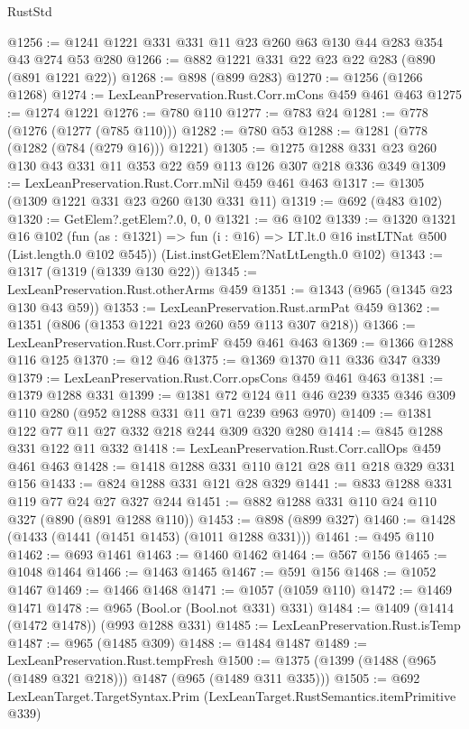 \begin{lexlean}{RustStd}
\begin{coremodule}
@1256 := @1241 @1221 @331 @331 @11 @23 @260 @63 @130 @44 @283 @354 @43 @274 @53 @280
@1266 := @882 @1221 @331 @22 @23 @22 @283 (@890 (@891 @1221 @22))
@1268 := @898 (@899 @283)
@1270 := @1256 (@1266 @1268)
@1274 := LexLeanPreservation.Rust.Corr.mCons @459 @461 @463
@1275 := @1274 @1221
@1276 := @780 @110
@1277 := @783 @24
@1281 := @778 (@1276 (@1277 (@785 @110)))
@1282 := @780 @53
@1288 := @1281 (@778 (@1282 (@784 (@279 @16))) @1221)
@1305 := @1275 @1288 @331 @23 @260 @130 @43 @331 @11 @353 @22 @59 @113 @126 @307 @218 @336 @349
@1309 := LexLeanPreservation.Rust.Corr.mNil @459 @461 @463
@1317 := @1305 (@1309 @1221 @331 @23 @260 @130 @331 @11)
@1319 := @692 (@483 @102)
@1320 := GetElem?.getElem?.{0, 0, 0}
@1321 := @6 @102
@1339 := @1320
    @1321
    @16
    @102
    (fun (as : @1321) => fun (i : @16) => LT.lt.{0} @16 instLTNat @500 (List.length.{0} @102 @545))
    (List.instGetElem?NatLtLength.{0} @102)
@1343 := @1317 (@1319 (@1339 @130 @22))
@1345 := LexLeanPreservation.Rust.otherArms @459
@1351 := @1343 (@965 (@1345 @23 @130 @43 @59))
@1353 := LexLeanPreservation.Rust.armPat @459
@1362 := @1351 (@806 (@1353 @1221 @23 @260 @59 @113 @307 @218))
@1366 := LexLeanPreservation.Rust.Corr.primF @459 @461 @463
@1369 := @1366 @1288 @116 @125
@1370 := @12 @46
@1375 := @1369 @1370 @11 @336 @347 @339
@1379 := LexLeanPreservation.Rust.Corr.opsCons @459 @461 @463
@1381 := @1379 @1288 @331
@1399 := @1381
    @72
    @124
    @11
    @46
    @239
    @335
    @346
    @309
    @110
    @280
    (@952 @1288 @331 @11 @71 @239 @963 @970)
@1409 := @1381 @122 @77 @11 @27 @332 @218 @244 @309 @320 @280
@1414 := @845 @1288 @331 @122 @11 @332
@1418 := LexLeanPreservation.Rust.Corr.callOps @459 @461 @463
@1428 := @1418 @1288 @331 @110 @121 @28 @11 @218 @329 @331 @156
@1433 := @824 @1288 @331 @121 @28 @329
@1441 := @833 @1288 @331 @119 @77 @24 @27 @327 @244
@1451 := @882 @1288 @331 @110 @24 @110 @327 (@890 (@891 @1288 @110))
@1453 := @898 (@899 @327)
@1460 := @1428 (@1433 (@1441 (@1451 @1453) (@1011 @1288 @331)))
@1461 := @495 @110
@1462 := @693 @1461
@1463 := @1460 @1462
@1464 := @567 @156
@1465 := @1048 @1464
@1466 := @1463 @1465
@1467 := @591 @156
@1468 := @1052 @1467
@1469 := @1466 @1468
@1471 := @1057 (@1059 @110)
@1472 := @1469 @1471
@1478 := @965 (Bool.or (Bool.not @331) @331)
@1484 := @1409 (@1414 (@1472 @1478)) (@993 @1288 @331)
@1485 := LexLeanPreservation.Rust.isTemp
@1487 := @965 (@1485 @309)
@1488 := @1484 @1487
@1489 := LexLeanPreservation.Rust.tempFresh
@1500 := @1375 (@1399 (@1488 (@965 (@1489 @321 @218))) @1487 (@965 (@1489 @311 @335)))
@1505 := @692 LexLeanTarget.TargetSyntax.Prim (LexLeanTarget.RustSemantics.itemPrimitive @339)

\end{coremodule}
\end{lexlean}
